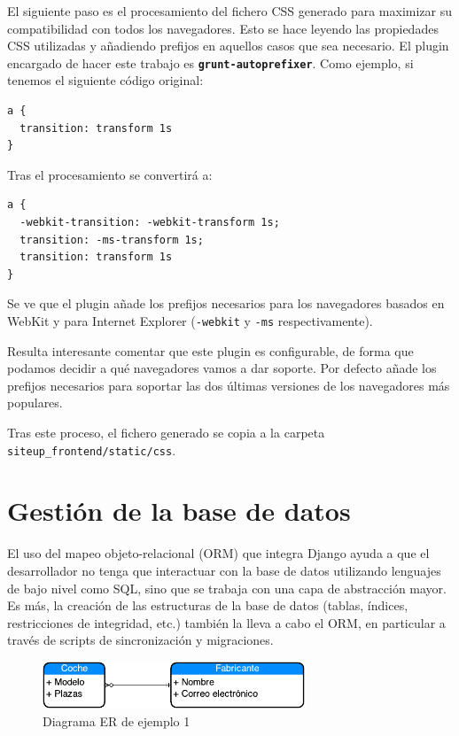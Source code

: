 El siguiente paso es el procesamiento del fichero CSS generado para maximizar su
compatibilidad con todos los navegadores. Esto se hace leyendo las propiedades
CSS utilizadas y añadiendo prefijos en aquellos casos que sea necesario. El
plugin encargado de hacer este trabajo es
\textbf{\texttt{grunt-autoprefixer}}. Como ejemplo, si tenemos el siguiente
código original:

\begin{verbatim}
a {
  transition: transform 1s
}
\end{verbatim}

Tras el procesamiento se convertirá a:

\begin{verbatim}
a {
  -webkit-transition: -webkit-transform 1s;
  transition: -ms-transform 1s;
  transition: transform 1s
}
\end{verbatim}

Se ve que el plugin añade los prefijos necesarios para los navegadores basados
en WebKit y para Internet Explorer (\texttt{-webkit} y \texttt{-ms}
respectivamente).

Resulta interesante comentar que este plugin es configurable, de forma que
podamos decidir a qué navegadores vamos a dar soporte. Por defecto añade los
prefijos necesarios para soportar las dos últimas versiones de los navegadores
más populares.

Tras este proceso, el fichero generado se copia a la carpeta
\texttt{siteup\_frontend/static/css}.

\section{Gestión de la base de datos}

El uso del mapeo objeto-relacional (ORM) que integra Django ayuda a que el
desarrollador no tenga que interactuar con la base de datos utilizando lenguajes
de bajo nivel como \ac{SQL}, sino que se trabaja con una capa de abstracción
mayor. Es más, la creación de las estructuras de la base de datos (tablas,
índices, restricciones de integridad, etc.) también la lleva a cabo el ORM, en
particular a través de scripts de sincronización y migraciones.

\begin{figure}[hbtp]
  \centering
  \includegraphics[width=0.7\textwidth]{6_implementacion/diagrama-er-1}
  \caption{Diagrama ER de ejemplo 1}
  \label{fig:er-1}
\end{figure}

